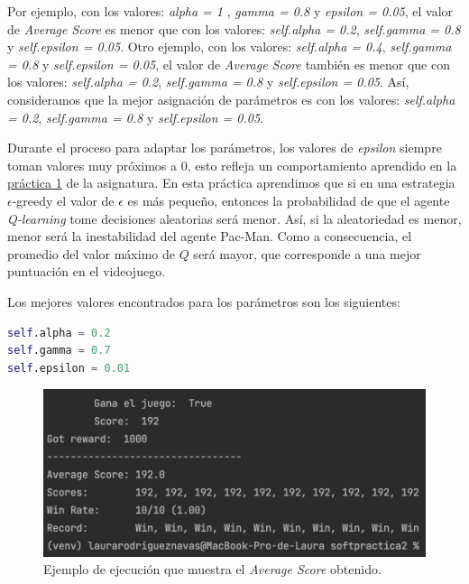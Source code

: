 \documentclass[11pt]{exam}
\begin{document}
Por ejemplo, con los valores: \textit{alpha = 1} , \textit{gamma = 0.8} y \textit{epsilon = 0.05}, el valor de \textit{Average Score} es menor que con los valores: \textit{self.alpha = 0.2}, \textit{self.gamma = 0.8} y \textit{self.epsilon = 0.05}. Otro ejemplo, con los valores: \textit{self.alpha = 0.4}, \textit{self.gamma = 0.8} y \textit{self.epsilon = 0.05}, el valor de \textit{Average Score} también es menor que con los valores: \textit{self.alpha = 0.2}, \textit{self.gamma = 0.8} y \textit{self.epsilon = 0.05}. Así, consideramos que la mejor asignación de parámetros es con los valores: \textit{self.alpha = 0.2}, \textit{self.gamma = 0.8} y \textit{self.epsilon = 0.05}.

Durante el proceso para adaptar los parámetros, los valores de \textit{epsilon} siempre toman valores muy próximos a 0, esto refleja un comportamiento aprendido en la \href{https://poliformat.upv.es/portal/site/ESP_0_2835/tool/c07b745a-0cfd-44f0-a7a2-9bb22f80c3f7?panel=Main}{práctica 1} de la asignatura. En esta práctica aprendimos que si en una estrategia $\epsilon$-greedy el valor de $\epsilon$ es más pequeño, entonces la probabilidad de que el agente \textit{Q-learning} tome decisiones aleatorias será menor. Así, si la aleatoriedad es menor, menor será la inestabilidad del agente Pac-Man. Como a consecuencia, el promedio del valor máximo de $Q$ será mayor, que corresponde a una mejor puntuación en el videojuego.

Los mejores valores encontrados para los parámetros son los siguientes:
\vspace*{3mm}

\begin{lstlisting}[language=python, basicstyle=\footnotesize]
self.alpha = 0.2
self.gamma = 0.7
self.epsilon = 0.01
\end{lstlisting}

\begin{figure}[H]
	\centering
	\includegraphics[scale=0.5]{figures/average_score}
	\caption{Ejemplo de ejecución que muestra el  \textit{Average Score} obtenido.}
	\label{average_score}
\end{figure}
\end{document}
